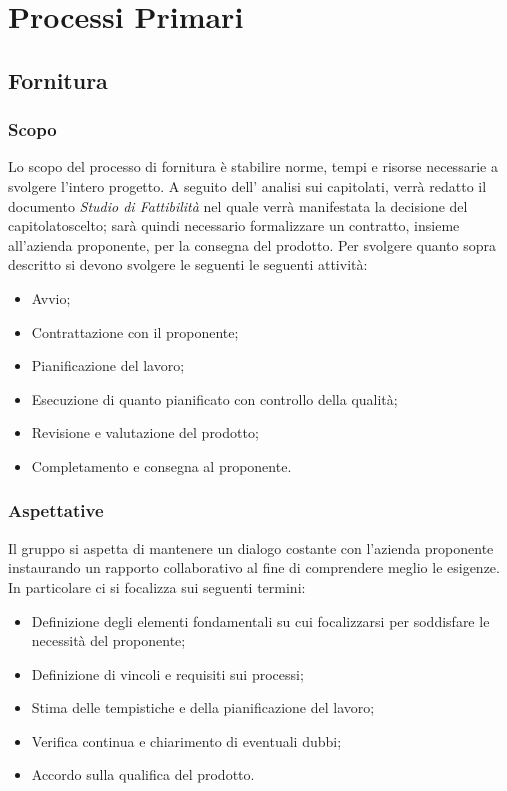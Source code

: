 \section{Processi Primari}

\subsection{Fornitura}
\subsubsection{Scopo}
Lo scopo del processo di fornitura è stabilire norme, tempi e risorse necessarie a svolgere l'intero progetto.
A seguito dell' analisi sui capitolati, verrà redatto il documento \textit{Studio di Fattibilità} nel quale verrà manifestata la decisione del capitolato\glosp scelto; sarà quindi necessario formalizzare un contratto, insieme all'azienda proponente, per la consegna del prodotto. 
Per svolgere quanto sopra descritto si devono svolgere le seguenti  le seguenti attività:
\begin{itemize}
	\item Avvio;
	\item Contrattazione con il proponente;
	\item Pianificazione del lavoro;
	\item Esecuzione di quanto pianificato con controllo della qualità;
	\item Revisione e valutazione del prodotto;
	\item Completamento e consegna al proponente.
\end{itemize}
\subsubsection{Aspettative}
Il gruppo si aspetta di mantenere un dialogo costante con l'azienda proponente instaurando un rapporto collaborativo al fine di comprendere meglio le esigenze. In particolare ci si focalizza sui seguenti termini:
\begin{itemize}
	\item Definizione degli elementi fondamentali su cui focalizzarsi per soddisfare le necessità del proponente;
	\item Definizione di vincoli e requisiti sui processi;
	\item Stima delle tempistiche e della pianificazione del lavoro;
	\item Verifica continua e chiarimento di eventuali dubbi;
	\item Accordo sulla qualifica del prodotto.
\end{itemize}
